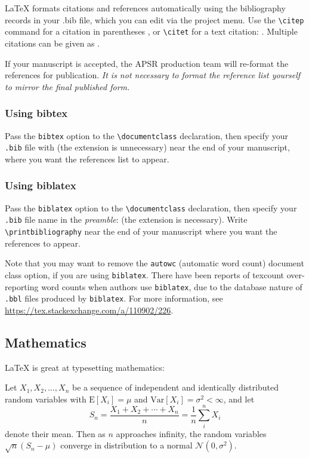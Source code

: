 \documentclass[bibtex,autowc]{apsr_submission}
\begin{document}
\LaTeX{} formats citations and references automatically using the bibliography records in your .bib file, which you can edit via the project menu. Use the \verb|\citep| command for a citation in parentheses \citep{greenwade93}, or  \verb|\citet| for a text citation: \citet{greenwade93}. Multiple citations can be given as \citep{greenwade93,knuth1984texbook}.

If your manuscript is accepted, the APSR production team will re-format the references for publication. \emph{It is not necessary to format the reference list yourself to mirror the final published form.}

\subsubsection{Using bibtex} Pass the \texttt{bibtex} option to the \verb|\documentclass| declaration, then specify your \texttt{.bib} file with \verb|| (the extension is unnecessary) near the end of your manuscript, where you want the references list to appear.

\subsubsection{Using biblatex} Pass the \texttt{biblatex} option to the \verb|\documentclass| declaration, then specify your \texttt{.bib} file name in the \emph{preamble}: \verb|| (the extension is necessary). Write \verb|\printbibliography| near the end of your manuscript where you want the references to appear.

Note that you may want to remove the \texttt{autowc} (automatic word count) document class option, if you are using \texttt{biblatex}. There have been reports of texcount over-reporting word counts when authors use \texttt{biblatex}, due to the database nature of \texttt{.bbl} files produced by \texttt{biblatex}. For more information, see \url{https://tex.stackexchange.com/a/110902/226}.

\subsection{Mathematics}

\LaTeX{} is great at typesetting mathematics:

Let $X_1, X_2, \ldots, X_n$ be a sequence of independent and identically distributed random variables with $\text{E}[X_i] = \mu$ and $\text{Var}[X_i] = \sigma^2 < \infty$, and let
\begin{equation}
\label{eq:CLT}
S_n = \frac{X_1 + X_2 + \cdots + X_n}{n}
      = \frac{1}{n}\sum_{i}^{n} X_i
\end{equation}
denote their mean. Then as $n$ approaches infinity, the random variables $\sqrt{n}(S_n - \mu)$ converge in distribution to a normal $\mathcal{N}(0, \sigma^2)$.
\end{document}
